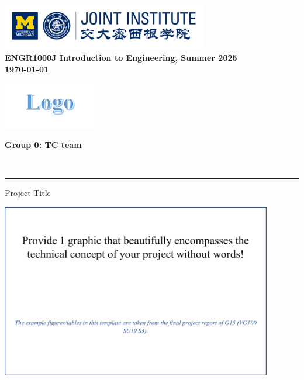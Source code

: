 \documentclass{engr1000j-s2} %
\begin{document}
  \thispagestyle{firstpage}
  \includegraphics[height=0.8in]{figures/headlogo.png}
  \\ \textbf{\Large ENGR1000J Introduction to Engineering, Summer 2025}\\[0.5em]
  \textbf{{\Large \today}}\\[0em]
  \begin{center}
    \begin{minipage}{0.45\textwidth}
      \includegraphics[height=0.8in]{figures/team logo.png}
    \end{minipage}\hfill
    \begin{minipage}{0.45\textwidth}
      \textbf{\Large Group 0: TC team}
    \end{minipage}\\[0.2em]
  \end{center}

  

  \noindent
  {\color{gray!30}\rule{\textwidth}{0.1pt}}

  {\Huge Project Title}

  {\includegraphics[height=3in]{figures/preface_picture.png}}

  \hspace{1em}
\end{document}
